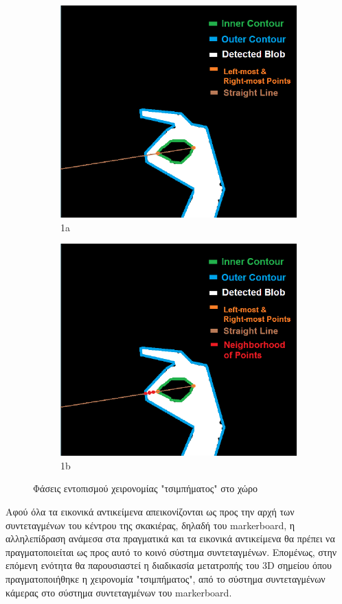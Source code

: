 \begin{figure}[H]
\begin{subfigure}{.5\textwidth}
  \includegraphics[width=.8\linewidth]{Files/Figures/4.pdf}
  \caption{1a}
  \label{fig:sfig111}
\end{subfigure}%
\begin{subfigure}{.5\textwidth}
  \centering
  \includegraphics[width=.8\linewidth]{Files/Figures/5.pdf}
  \caption{1b}
  \label{fig:sfig2222}
\end{subfigure}
\caption{Φάσεις εντοπισμού χειρονομίας "τσιμπήματος" στο χώρο}
\label{fig:fig}
\end{figure}



Αφού όλα τα εικονικά αντικείμενα απεικονίζονται ως προς την αρχή των συντεταγμένων του κέντρου της σκακιέρας, δηλαδή του markerboard, η αλληλεπίδραση ανάμεσα στα πραγματικά και τα εικονικά αντικείμενα θα πρέπει να πραγματοποιείται ως προς αυτό το κοινό σύστημα συντεταγμένων. Επομένως, στην επόμενη ενότητα θα παρουσιαστεί η διαδικασία μετατροπής του 3D σημείου όπου πραγματοποιήθηκε η χειρονομία "τσιμπήματος", από το σύστημα συντεταγμένων κάμερας στο σύστημα συντεταγμένων του markerboard.



